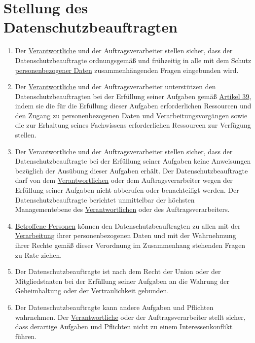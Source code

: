 \chapter{Stellung des Datenschutzbeauftragten}
\label{ch:38}


\begin{enumerate}

  \item Der \hyperref[itm:04-7]{Verantwortliche} und der Auftragsverarbeiter stellen sicher, dass der Datenschutzbeauftragte ordnungsgemäß
   und frühzeitig in alle mit dem Schutz \hyperref[itm:04-1]{personenbezogener Daten} zusammenhängenden Fragen eingebunden wird.
  \label{itm:38-1}

  \item Der \hyperref[itm:04-7]{Verantwortliche} und der Auftragsverarbeiter unterstützen den Datenschutzbeauftragten bei der Erfüllung
   seiner Aufgaben gemäß \hyperref[ch:39]{Artikel 39}, indem sie die für die Erfüllung dieser Aufgaben erforderlichen
   Ressourcen und den Zugang zu \hyperref[itm:04-1]{personenbezogenen Daten} und Verarbeitungsvorgängen sowie die zur Erhaltung seines
   Fachwissens erforderlichen Ressourcen zur Verfügung stellen.
  \label{itm:38-2}

  \item Der \hyperref[itm:04-7]{Verantwortliche} und der Auftragsverarbeiter stellen sicher, dass der Datenschutzbeauftragte bei der
   Erfüllung seiner Aufgaben keine Anweisungen bezüglich der Ausübung dieser Aufgaben erhält. Der
   Datenschutzbeauftragte darf von dem \hyperref[itm:04-7]{Verantwortlichen} oder dem Auftragsverarbeiter wegen der Erfüllung seiner
   Aufgaben nicht abberufen oder benachteiligt werden. Der Datenschutzbeauftragte berichtet unmittelbar der höchsten
   Managementebene des \hyperref[itm:04-7]{Verantwortlichen} oder des Auftragsverarbeiters.
  \label{itm:38-3}

  \item \hyperref[itm:04-1]{Betroffene Personen} können den Datenschutzbeauftragten zu allen mit der \hyperref[itm:04-2]{Verarbeitung} ihrer personenbezogenen
   Daten und mit der Wahrnehmung ihrer Rechte gemäß dieser Verordnung im Zusammenhang stehenden Fragen zu Rate ziehen.
  \label{itm:38-4}

  \item Der Datenschutzbeauftragte ist nach dem Recht der Union oder der Mitgliedstaaten bei der Erfüllung seiner
   Aufgaben an die Wahrung der Geheimhaltung oder der Vertraulichkeit gebunden.
  \label{itm:38-5}

  \item Der Datenschutzbeauftragte kann andere Aufgaben und Pflichten wahrnehmen. Der \hyperref[itm:04-7]{Verantwortliche} oder der
   Auftragsverarbeiter stellt sicher, dass derartige Aufgaben und Pflichten nicht zu einem Interessenkonflikt führen.
  \label{itm:38-6}

\end{enumerate}


